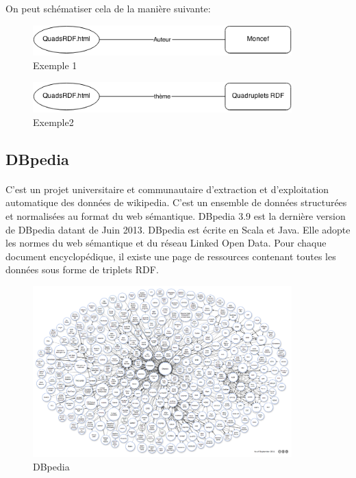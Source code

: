 On peut schématiser cela de la manière suivante:
\begin{figure}[H]
        \centering
                \centering
                \includegraphics[width=10cm]{moncef.png}
               \caption{Exemple 1}

\end{figure}
\begin{figure}[H]
        \centering
                \centering
                \includegraphics[width=10cm]{quads.png}
               \caption{Exemple2}

\end{figure}
\subsection*{DBpedia}
\paragraph{}
C'est un projet universitaire et communautaire d’extraction et d’exploitation automatique des données de wikipedia. C’est un ensemble de données structurées et normalisées au format du web sémantique.
DBpedia 3.9 est la dernière version de DBpedia datant de Juin 2013. DBpedia est écrite en Scala et Java.
Elle adopte les normes du web sémantique et du réseau Linked Open Data. Pour chaque document encyclopédique, il existe une page de ressources contenant toutes les données sous forme de triplets RDF.
\begin{figure}[H]
        \centering
                \centering
                \includegraphics[width=10cm]{dbpedia.png}
               \caption{DBpedia}

\end{figure}
\newpage
